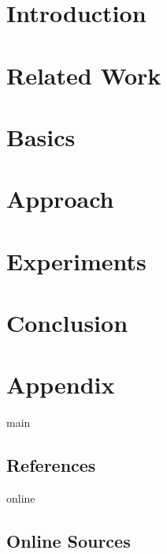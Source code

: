 \documentclass[11pt,a4paper]{report}
\begin{document}
    \tableofcontents
    \newpage


    \chapter{Introduction}
    \label{ch:1_introduction}
    


    \chapter{Related Work}
    \label{ch:2_related_work}
    


    \chapter{Basics}
    \label{ch:3_basics}
    


    \chapter{Approach}
    \label{ch:4_approach}
    


    \chapter{Experiments}
    \label{ch:5_experiments}
    


    \chapter{Conclusion}
    \label{ch:6_conclusion}
    


    \chapter{Appendix}
    \label{ch:a_appendix}
    

    \newpage

    

    \begin{btSect}{main}
        \section*{References}
        \btPrintCited
    \end{btSect}

    \begin{btSect}{online}
        \section*{Online Sources}
        \btPrintCited
    \end{btSect}
\end{document}
